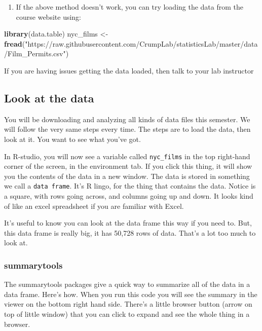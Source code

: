 \documentclass[
]{book}
\newenvironment{Shaded}{\begin{snugshade}}{\end{snugshade}}
\newcommand{\FunctionTok}[1]{\textcolor[rgb]{0.13,0.29,0.53}{\textbf{#1}}}
\newcommand{\NormalTok}[1]{#1}
\newcommand{\OtherTok}[1]{\textcolor[rgb]{0.56,0.35,0.01}{#1}}
\newcommand{\StringTok}[1]{\textcolor[rgb]{0.31,0.60,0.02}{#1}}
\providecommand{\tightlist}{%
  \setlength{\itemsep}{0pt}\setlength{\parskip}{0pt}}
\begin{document}
\begin{enumerate}
\def\labelenumi{\arabic{enumi}.}
\setcounter{enumi}{1}
\tightlist
\item
  If the above method doesn't work, you can try loading the data from the course website using:
\end{enumerate}

\begin{Shaded}
\begin{Highlighting}[]
\FunctionTok{library}\NormalTok{(data.table)}
\NormalTok{nyc\_films }\OtherTok{\textless{}{-}} \FunctionTok{fread}\NormalTok{(}\StringTok{"https://raw.githubusercontent.com/CrumpLab/statisticsLab/master/data/Film\_Permits.csv"}\NormalTok{)}
\end{Highlighting}
\end{Shaded}

If you are having issues getting the data loaded, then talk to your lab instructor

\hypertarget{look-at-the-data}{%
\subsection{Look at the data}\label{look-at-the-data}}

You will be downloading and analyzing all kinds of data files this semester. We will follow the very same steps every time. The steps are to load the data, then look at it. You want to see what you've got.

In R-studio, you will now see a variable called \texttt{nyc\_films} in the top right-hand corner of the screen, in the environment tab. If you click this thing, it will show you the contents of the data in a new window. The data is stored in something we call a \texttt{data\ frame}. It's R lingo, for the thing that contains the data. Notice is a square, with rows going across, and columns going up and down. It looks kind of like an excel spreadsheet if you are familiar with Excel.

It's useful to know you can look at the data frame this way if you need to. But, this data frame is really big, it has 50,728 rows of data. That's a lot too much to look at.

\hypertarget{summarytools}{%
\subsubsection{summarytools}\label{summarytools}}

The summarytools packages give a quick way to summarize all of the data in a data frame. Here's how. When you run this code you will see the summary in the viewer on the bottom right hand side. There's a little browser button (arrow on top of little window) that you can click to expand and see the whole thing in a browser.
\end{document}
